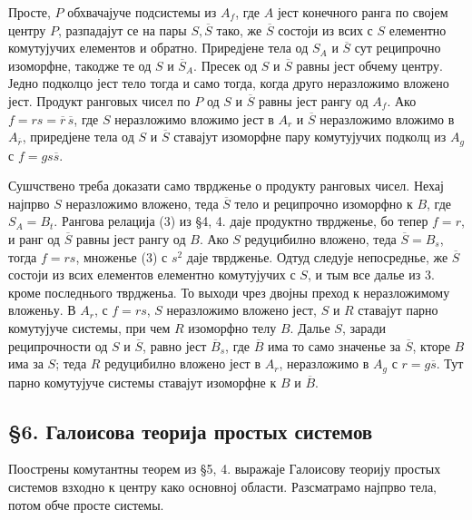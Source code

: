 ﻿\documentclass[11pt]{article}
\begin{document}
Просте, \(P\) обхвачајуче подсистемы из \(A_f\), где \(A\) јест конечного ранга по својем центру \(P\), разпадајут се на пары \(S,\overline S\) тако, же \(\overline S\) состоји из всих с \(S\) елементно комутујучих елементов и обратно. Приредјене тела од \(S_A\) и \(\overline S\) сут реципрочно изоморфне, такодже те од \(S\) и \(\overline S_A\). Пресек од \(S\) и \(\overline S\) равны јест обчему центру. Једно подколцо јест тело тогда и само тогда, когда друго неразложимо вложено јест. Продукт ранговых чисел по \(P\) од \(S\) и \(\overline S\) равны јест рангу од \(A_f\). Ако \(f=rs=\overline r\,\overline s\), где \(S\) неразложимо вложимо јест в \(A_r\) и \(\overline S\) неразложимо вложимо в \(A_{\overline r}\), приредјене тела од \(S\) и \(\overline S\) ставајут изоморфне пару комутујучих подколц из \(A_g\) с \(f=g s\overline s\).

Сушчствено треба доказати само тврдженье о продукту ранговых чисел. Нехај најпрво \(S\) неразложимо вложено, теда \(\overline S\) тело и реципрочно изоморфно к \(B\), где \(S_A=B_t\). Рангова релација (3) из §4, 4. даје продуктно тврдженье, бо тепер \(f=r\), и ранг од \(\overline S\) равны јест рангу од \(B\). Ако \(S\) редуцибилно вложено, теда \(\overline S=B_s\), тогда \(f=rs\), множенье (3) с \(s^2\) даје тврдженье. Одтуд следује непосреднье, же \(\overline S\) состоји из всих елементов елементно комутујучих с \(S\), и тым все далье из 3. кроме последнього тврдженьа. То выходи чрез двојны преход к неразложимому вложеньу. В \(A_r\), с \(f=rs\), \(S\) неразложимо вложено јест, \(S\) и \(R\) ставајут парно комутујуче системы, при чем \(R\) изоморфно телу \(B\). Далье \(S\), заради реципрочности од \(S\) и \(\overline S\), равно јест \(\overline B_s\), где \(\overline B\) има то само значенье за \(\overline S\), кторе \(B\) има за \(S\); теда \(R\) редуцибилно вложено јест в \(A_r\), неразложимо в \(A_g\) с \(r=g\overline s\). Тут парно комутујуче системы ставајут изоморфне к \(B\) и \(\overline B\).

\subsection*{§6. Галоисова теорија простых системов}

Поострены комутантны теорем из §5, 4. выражаје Галоисову теорију простых системов взходно к центру како основној области. Разсматрамо најпрво тела, потом обче просте системы.
\end{document}

